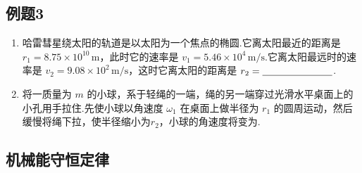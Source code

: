 \newpage
\subsection{例题3}

\begin{enumerate}
	\item 哈雷彗星绕太阳的轨道是以太阳为一个焦点的椭圆.它离太阳最近的距离是
	\(r_1 = 8.75 \times 10^{10}\,\mathrm{m}\)，此时它的速率是
	\(v_1 = 5.46 \times 10^{4}\,\mathrm{m/s}\).它离太阳最远时的速率是
	\(v_2 = 9.08 \times 10^{2}\,\mathrm{m/s}\)，这时它离太阳的距离是
	\(r_2 = \underline{\hspace{2.5cm}}\).
	
	\item 将一质量为 $m$ 的小球，系于轻绳的一端，绳的另一端穿过光滑水平桌面上的小孔用手拉住.先使小球以角速度 $\omega_1$ 在桌面上做半径为 $r_1$ 的圆周运动，然后缓慢将绳下拉，使半径缩小为$r_2$，小球的角速度将变为\underline{\hspace{2cm}}.
\end{enumerate}

\newpage
\subsection{机械能守恒定律}

